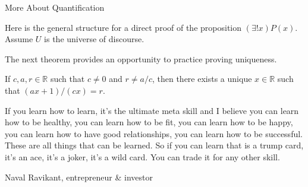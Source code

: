 \begin{section}{More About Quantification}
\begin{skeleton}\label{skeleton:uniqueness}
Here is the general structure for a direct proof of the proposition $(\exists! x)P(x)$. Assume $U$ is the universe of discourse.

\begin{center}
\end{center}
\end{skeleton}

The next theorem provides an opportunity to practice proving uniqueness.

\begin{theorem}
If $c,a,r\in\mathbb{R}$ such that $c\neq 0$ and $r\neq a/c$, then there exists a unique $x\in\mathbb{R}$ such that $(ax+1)/(cx)=r$.
\end{theorem}

\epigraph{If you learn how to learn, it's the ultimate meta skill and I believe you can learn how to be healthy, you can learn how to be fit, you can learn how to be happy, you can learn how to have good relationships, you can learn how to be successful. These are all things that can be learned. So if you can learn that is a trump card, it's an ace, it's a joker, it's a wild card. You can trade it for any other skill.}{Naval Ravikant,  entrepreneur \& investor}

\end{section}